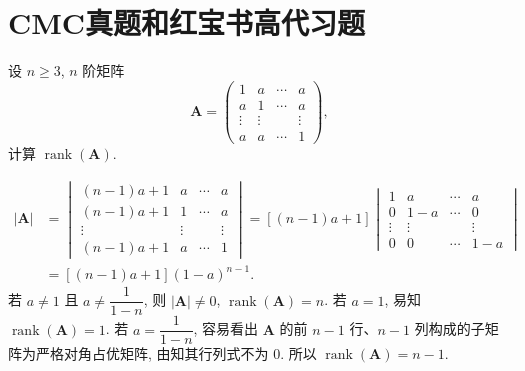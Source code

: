 \documentclass[../../main.tex]{subfiles}
\begin{document}
\section{CMC真题和红宝书高代习题}

\begin{example}
设 \(n \geqslant 3\), \(n\) 阶矩阵
\[
\boldsymbol{A} = \begin{pmatrix} 1 & a & \cdots & a \\ a & 1 & \cdots & a \\ \vdots & \vdots & & \vdots \\ a & a & \cdots & 1 \end{pmatrix},
\]
计算 \(\operatorname{rank}(\boldsymbol{A})\).
\end{example}
\begin{solution}
\[
\begin{aligned}
|\boldsymbol{A}| &= \begin{vmatrix} (n - 1)a + 1 & a & \cdots & a \\ (n - 1)a + 1 & 1 & \cdots & a \\ \vdots & \vdots & & \vdots \\ (n - 1)a + 1 & a & \cdots & 1 \end{vmatrix} = [(n - 1)a + 1] \begin{vmatrix} 1 & a & \cdots & a \\ 0 & 1 - a & \cdots & 0 \\ \vdots & \vdots & & \vdots \\ 0 & 0 & \cdots & 1 - a \end{vmatrix} \\
&= [(n - 1)a + 1](1 - a)^{n - 1}.
\end{aligned}
\]
若 \(a \neq 1\) 且 \(a \neq \dfrac{1}{1 - n}\), 则 \(|\boldsymbol{A}| \neq 0\), \(\operatorname{rank}(\boldsymbol{A}) = n\). 若 \(a = 1\), 易知 \(\operatorname{rank}(\boldsymbol{A}) = 1\). 若 \(a = \dfrac{1}{1 - n}\), 容易看出 \(\boldsymbol{A}\) 的前 \(n - 1\) 行、\(n - 1\) 列构成的子矩阵为严格对角占优矩阵, 由知其行列式不为 0. 所以 \(\operatorname{rank}(\boldsymbol{A}) = n - 1\).
\end{solution}
\end{document}
